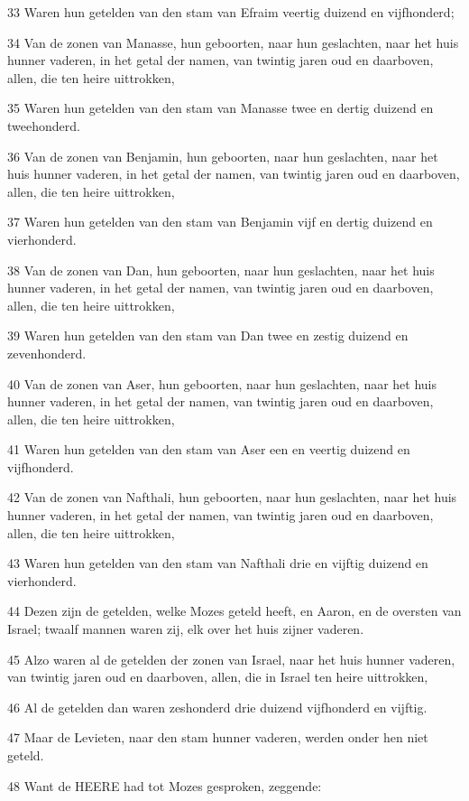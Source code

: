 \par 33 Waren hun getelden van den stam van Efraim veertig duizend en vijfhonderd;
\par 34 Van de zonen van Manasse, hun geboorten, naar hun geslachten, naar het huis hunner vaderen, in het getal der namen, van twintig jaren oud en daarboven, allen, die ten heire uittrokken,
\par 35 Waren hun getelden van den stam van Manasse twee en dertig duizend en tweehonderd.
\par 36 Van de zonen van Benjamin, hun geboorten, naar hun geslachten, naar het huis hunner vaderen, in het getal der namen, van twintig jaren oud en daarboven, allen, die ten heire uittrokken,
\par 37 Waren hun getelden van den stam van Benjamin vijf en dertig duizend en vierhonderd.
\par 38 Van de zonen van Dan, hun geboorten, naar hun geslachten, naar het huis hunner vaderen, in het getal der namen, van twintig jaren oud en daarboven, allen, die ten heire uittrokken,
\par 39 Waren hun getelden van den stam van Dan twee en zestig duizend en zevenhonderd.
\par 40 Van de zonen van Aser, hun geboorten, naar hun geslachten, naar het huis hunner vaderen, in het getal der namen, van twintig jaren oud en daarboven, allen, die ten heire uittrokken,
\par 41 Waren hun getelden van den stam van Aser een en veertig duizend en vijfhonderd.
\par 42 Van de zonen van Nafthali, hun geboorten, naar hun geslachten, naar het huis hunner vaderen, in het getal der namen, van twintig jaren oud en daarboven, allen, die ten heire uittrokken,
\par 43 Waren hun getelden van den stam van Nafthali drie en vijftig duizend en vierhonderd.
\par 44 Dezen zijn de getelden, welke Mozes geteld heeft, en Aaron, en de oversten van Israel; twaalf mannen waren zij, elk over het huis zijner vaderen.
\par 45 Alzo waren al de getelden der zonen van Israel, naar het huis hunner vaderen, van twintig jaren oud en daarboven, allen, die in Israel ten heire uittrokken,
\par 46 Al de getelden dan waren zeshonderd drie duizend vijfhonderd en vijftig.
\par 47 Maar de Levieten, naar den stam hunner vaderen, werden onder hen niet geteld.
\par 48 Want de HEERE had tot Mozes gesproken, zeggende:
